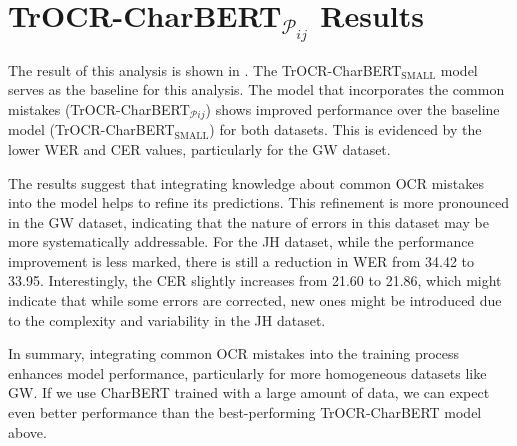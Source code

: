 \section{TrOCR-CharBERT$_{\mathcal{P}_{ij}}$ Results}
\label{sec:5_trocr_charbert_pij_results}
The result of this analysis is shown in . The TrOCR-CharBERT$_{\text{SMALL}}$ model serves as the baseline for this analysis. The model that incorporates the common mistakes (TrOCR-CharBERT$_{\mathcal{P}{ij}}$) shows improved performance over the baseline model (TrOCR-CharBERT$_{\text{SMALL}}$) for both datasets. This is evidenced by the lower WER and CER values, particularly for the GW dataset. 

The results suggest that integrating knowledge about common OCR mistakes into the model helps to refine its predictions. This refinement is more pronounced in the GW dataset, indicating that the nature of errors in this dataset may be more systematically addressable. For the JH dataset, while the performance improvement is less marked, there is still a reduction in WER from 34.42 to 33.95. Interestingly, the CER slightly increases from 21.60 to 21.86, which might indicate that while some errors are corrected, new ones might be introduced due to the complexity and variability in the JH dataset. 

In summary, integrating common OCR mistakes into the training process enhances model performance, particularly for more homogeneous datasets like GW. If we use CharBERT trained with a large amount of data, we can expect even better performance than the best-performing TrOCR-CharBERT model above.


